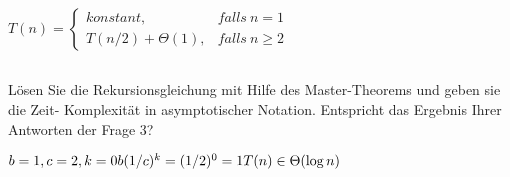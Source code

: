 \documentclass{article} %
\begin{document}
\begin{math}
T(n) =
\begin{cases}
konstant, & falls\ n = 1\\
T(n / 2) + \Theta(1), & falls\ n \geq 2
\end{cases}
\end{math}

\subsection{}
Lösen Sie die Rekursionsgleichung mit Hilfe des Master-Theorems und geben sie die Zeit-
Komplexität in asymptotischer Notation. Entspricht das Ergebnis Ihrer Antworten der Frage 3?

\begin{math}\\
b=1, c = 2, k = 0 \\\\
b(1/c)^k = (1/2)^0 = 1 \\\\
T(n) \in \Theta(\log n) \\\\
\end{math}
\end{document}

